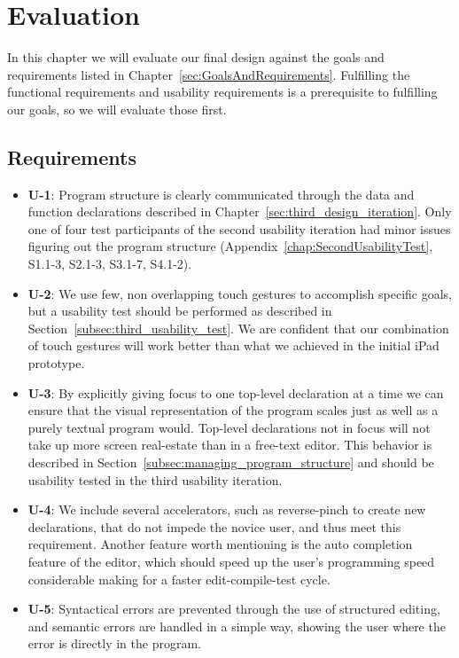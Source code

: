 \chapter{Evaluation}
\label{sec:Evaluation}
In this chapter we will evaluate our final design against the goals and requirements listed in Chapter~\ref{sec:GoalsAndRequirements}.
Fulfilling the functional requirements and usability requirements is a
prerequisite to fulfilling our goals, so we will evaluate those first.

\section{Requirements}
\begin{itemize}

\item \textbf{U-1}: Program structure is clearly communicated through the data and function declarations described in Chapter~\ref{sec:third_design_iteration}.
Only one of four test participants of the second usability iteration had minor
issues figuring out the program structure (Appendix~\ref{chap:SecondUsabilityTest},
S1.1-3, S2.1-3, S3.1-7, S4.1-2).
\item \textbf{U-2}: We use few, non overlapping touch gestures to accomplish specific goals,
but a usability test should be performed as described in Section~\ref{subsec:third_usability_test}.
We are confident that our combination of touch gestures will work better than
what we achieved in the initial iPad prototype.
\item \textbf{U-3}: By explicitly giving focus to one top-level declaration at
a time we can ensure that the visual representation of the program scales just
as well as a purely textual program would. Top-level declarations not in focus
will not take up more screen real-estate than in a free-text editor. This
behavior is described in Section~\ref{subsec:managing_program_structure} and
should be usability tested in the third usability iteration.
\item \textbf{U-4}: We include several accelerators, such as reverse-pinch to create new declarations, that do not impede the novice user, and thus meet this requirement.
Another feature worth mentioning is the auto completion feature of the editor,
which should speed up the user's programming speed considerable making for a
faster edit-compile-test cycle.
\item \textbf{U-5}: Syntactical errors are prevented through the use of structured editing, and semantic errors are handled in a simple way, showing the user where the error is directly in the program.

\end{itemize}
